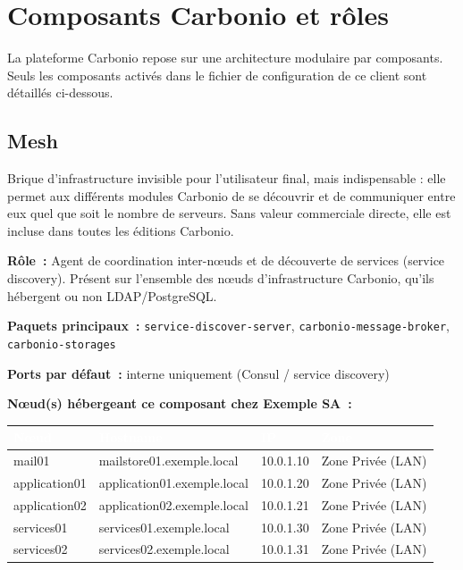 \documentclass[11pt,a4paper]{report}
\newcommand{\tblhead}[1]{\textcolor{white}{\textbf{#1}}}
\begin{document}
\clearpage
\section{Composants Carbonio et rôles}
La plateforme Carbonio repose sur une architecture modulaire par composants. Seuls les composants activés dans le fichier de configuration de ce client sont détaillés ci-dessous.

\subsection{Mesh}

Brique d'infrastructure invisible pour l'utilisateur final, mais indispensable : elle permet aux différents modules Carbonio de se découvrir et de communiquer entre eux quel que soit le nombre de serveurs.\allowbreak{} Sans valeur commerciale directe, elle est incluse dans toutes les éditions Carbonio.\allowbreak{}

\textbf{Rôle~:} Agent de coordination inter-\allowbreak{}nœuds et de découverte de services (service discovery).\allowbreak{} Présent sur l'ensemble des nœuds d'infrastructure Carbonio, qu'ils hébergent ou non LDAP/PostgreSQL.\allowbreak{}

\textbf{Paquets principaux~:} \texttt{service-\allowbreak{}discover-\allowbreak{}server}, \texttt{carbonio-\allowbreak{}message-\allowbreak{}broker}, \texttt{carbonio-\allowbreak{}storages}

\textbf{Ports par défaut~:} interne uniquement (Consul / service discovery)

\textbf{Nœud(s) hébergeant ce composant chez Exemple SA~:}
\begin{longtable}{|p{3.2cm}|p{4.5cm}|p{3.2cm}|p{2.3cm}|}
\hline
\rowcolor{primary}\tblhead{Nœud} & \tblhead{Hostname} & \tblhead{IP} & \tblhead{Zone} \\
\hline
\endhead
mail01 & mailstore01.\allowbreak{}exemple.\allowbreak{}local & 10.\allowbreak{}0.\allowbreak{}1.\allowbreak{}10 & Zone Privée (LAN) \\
\hline
application01 & application01.\allowbreak{}exemple.\allowbreak{}local & 10.\allowbreak{}0.\allowbreak{}1.\allowbreak{}20 & Zone Privée (LAN) \\
\hline
application02 & application02.\allowbreak{}exemple.\allowbreak{}local & 10.\allowbreak{}0.\allowbreak{}1.\allowbreak{}21 & Zone Privée (LAN) \\
\hline
services01 & services01.\allowbreak{}exemple.\allowbreak{}local & 10.\allowbreak{}0.\allowbreak{}1.\allowbreak{}30 & Zone Privée (LAN) \\
\hline
services02 & services02.\allowbreak{}exemple.\allowbreak{}local & 10.\allowbreak{}0.\allowbreak{}1.\allowbreak{}31 & Zone Privée (LAN) \\
\hline
\end{longtable}
\end{document}
